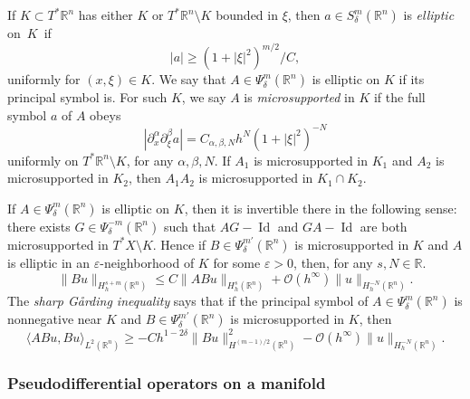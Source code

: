 \documentclass[reqno, 12pt]{amsart}
\newcommand \N {\mathbb{N}}
\newcommand \R {\mathbb{R}}
\newcommand \Oh {\mathcal{O}}
\newcommand \la {\langle}
\newcommand \ra {\rangle}
\newcommand \D {\partial}
\newcommand \eps {\varepsilon}
\DeclareMathOperator \WF {WF}
\DeclareMathOperator \Id {Id}
\theoremstyle{definition}
\numberwithin{equation}{section}
\numberwithin{prop}{section}
\numberwithin{figure}{section}
\begin{document}
If $K \subset T^*\R^n$ has either $K$ or $T^*\R^n \setminus K$ bounded in $\xi$, then $a \in S_\delta^m(\R^n)$ is \emph{elliptic} on~$K$~if
\begin{equation}\label{ellipdef}|a| \ge  (1+|\xi|^2)^{m/2}/C,\end{equation}
uniformly for $(x,\xi) \in K$. We say that $A \in \Psi_\delta^m(\R^n)$ is elliptic on $K$ if its principal symbol is. For such $K$, we say $A$ is \textit{microsupported} in $K$ if the full symbol $a$ of $A$ obeys 
\begin{equation}\label{e:microsuppdef}
|\D_x^\alpha \D^\beta_\xi a| =  C_{\alpha,\beta,N}h^N (1 + |\xi|^2)^{-N}
\end{equation}
uniformly on $T^*\R^n\setminus K$, for any $\alpha, \beta, N$. 
If $A_1$ is microsupported in $K_1$ and $A_2$ is microsupported in $K_2$, then $A_1A_2$ is microsupported in $K_1 \cap K_2$.

If $A \in \Psi^m_\delta(\R^n)$ is elliptic on $K$, then it is invertible there in the following sense: there exists $G \in \Psi^{-m}_\delta(\R^n)$ such that $AG - \Id$ and $GA - \Id$ are both microsupported in $T^*X \setminus K$. Hence if $B \in \Psi_\delta^{m'}(\R^n)$ is microsupported in $K$ and $A$ is elliptic in an $\eps$-neighborhood of $K$ for some $\eps > 0$, then, for any $s,N \in \R$.
\begin{equation}\label{ellipestrn} \|Bu\|_{H^{s+m}_h(\R^n)} \le C \|ABu\|_{H^{s}_h(\R^n)} + \Oh(h^\infty)\|u\|_{H^{-N}_h(\R^n)}.\end{equation}
The \textit{sharp G\aa rding inequality}  says that if the principal symbol of $A \in \Psi_\delta^m(\R^n)$ is nonnegative near $K$ and $B \in \Psi_\delta^{m'}(\R^n)$ is microsupported in $K$, then
\begin{equation}\label{gardingrn}\la A B u, B u \ra_{L^2(\R^n)} \ge -Ch^{1-2\delta} \|B u\|^2_{H^{(m-1)/2}(\R^n)} - \Oh(h^\infty)\|u\|_{H^{-N}_h(\R^n)}.\end{equation}

\subsubsection{Pseudodifferential operators on a manifold}\label{secpseudoman} 
\end{document}

